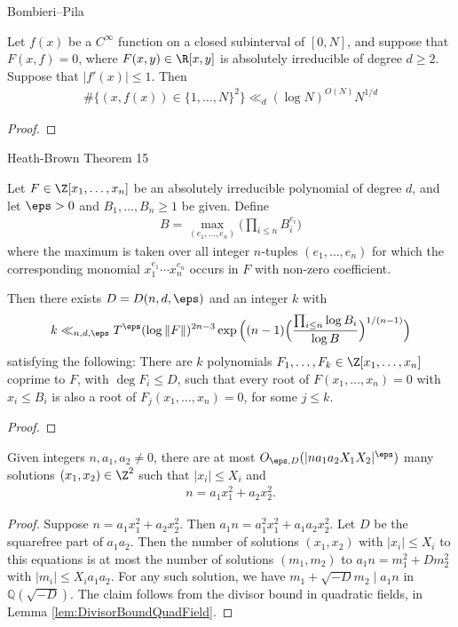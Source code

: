 Bombieri--Pila \cite[Theorem 4]{bp}
\begin{theorem}\label{thm:BombieriPilaforDet}
  Let $f(x)$ be a $C^\infty$ function on a closed subinterval of $[0,N]$,
  and suppose that$F (x, f ) = 0$, where $F(x, y) \in \R[x, y]$ is absolutely irreducible of degree $d \ge 2$.
  Suppose that $|f'(x)| \le 1$. Then
  \begin{align*}
    \#\{(x,f(x))\in \{1,\ldots,N\}^2 \}
    \ll_d (\log N)^{O(N)} N^{1/d}
  \end{align*}
\end{theorem}
\begin{proof}
\end{proof}

Heath-Brown Theorem 15

\begin{theorem} \label{thm:HeathBrownpadicDet}
  Let $F\in \Z[x_1 ,\ldots, x_n]$ be an absolutely irreducible polynomial of degree $d$,
  and let $\eps > 0$ and $B_1,\ldots,B_n \ge 1$ be given. Define
  \begin{align*}
    B = \max_{(e_1,\ldots,e_n)}\Big( \prod_{i\le n} B_i^{e_i} \Big)
  \end{align*}
  where the maximum is taken over all integer $n$-tuples $(e_1,\ldots,e_n)$ for which the
  corresponding monomial $x_1^{e_1}\cdots x_n^{e_n}$ occurs in $F$ with non-zero coefficient.

  Then there exists $D = D(n,d,\eps)$ and an integer $k$ with
  \begin{align*}
    k \ll_{n,d,\eps}  T^\eps (\log \|F\|)^{2n-3}
    \exp\Big((n-1)\Big(\frac{\prod_{i\le n}\log B_i}{\log B}\Big)^{1/(n-1)}\Big)
  \end{align*}
  satisfying the following:
  There are $k$ polynomials $F_1,\ldots,F_k\in \Z[x_1 ,\ldots, x_n]$ coprime to $F$,
  with $\deg F_i \le D$, such that every root of $F(x_1 ,\ldots, x_n)=0$ with $x_i \le B_i$
  is also a root of $F_j(x_1 ,\ldots, x_n)=0$, for some $j\le k$.
\end{theorem}
\begin{proof}
\end{proof}

\begin{theorem} \label{thm:QuadraticFormsEstimate}
  Given integers $n,a_1,a_2\neq0$, there are
  at most $O_{\eps,D}(|na_1a_2 X_1 X_2|^{\eps})$ many solutions
  $(x_1,x_2)\in\Z^2$ such that $|x_i|\le X_i$ and
  \begin{align*}
    n = a_1 x_1^2 + a_2 x_2^2.
  \end{align*}
\end{theorem}
\begin{proof}
  Suppose $n=a_1x_1^2+a_2x_2^2$. Then $a_1n=a_1^2x_1^2+a_1a_2x_2^2$.
  Let $D$ be the squarefree part of $a_1a_2$. Then the number of solutions $(x_1,x_2)$
   with $|x_i|\leq X_i$ to this equations is at most the number of solutions $(m_1,m_2)$
    to $a_1n=m_1^2+Dm_2^2$ with $|m_i|\leq X_ia_1a_2$. For any such solution,
    we have $m_1+\sqrt{-D}m_2\mid a_1n$ in $\mathbb{Q}(\sqrt{-D})$.
    The claim follows from the divisor bound in quadratic fields, in Lemma \ref{lem:DivisorBoundQuadField}.
\end{proof}

